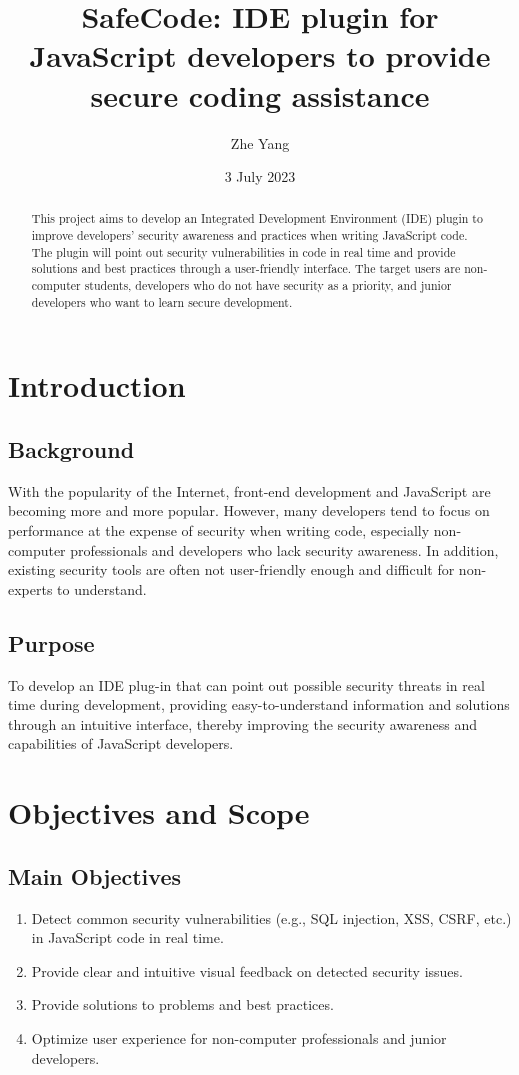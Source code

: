 \documentclass{proposal}
\title{SafeCode: IDE plugin for JavaScript developers to provide secure coding assistance}
\author{Zhe Yang}
\date{3 July 2023}
\begin{document}
\maketitle

\begin{abstract}
This project aims to develop an Integrated Development Environment (IDE) plugin to improve developers' security awareness and practices when writing JavaScript code. The plugin will point out security vulnerabilities in code in real time and provide solutions and best practices through a user-friendly interface. The target users are non-computer students, developers who do not have security as a priority, and junior developers who want to learn secure development.
\end{abstract}

\section{Introduction}

\subsection{Background}
With the popularity of the Internet, front-end development and JavaScript are becoming more and more popular. However, many developers tend to focus on performance at the expense of security when writing code, especially non-computer professionals and developers who lack security awareness. In addition, existing security tools are often not user-friendly enough and difficult for non-experts to understand.

\subsection{Purpose}
To develop an IDE plug-in that can point out possible security threats in real time during development, providing easy-to-understand information and solutions through an intuitive interface, thereby improving the security awareness and capabilities of JavaScript developers.

\section{Objectives and Scope}

\subsection{Main Objectives}
\begin{enumerate}
    \item Detect common security vulnerabilities (e.g., SQL injection, XSS, CSRF, etc.) in JavaScript code in real time.
    \item Provide clear and intuitive visual feedback on detected security issues.
    \item Provide solutions to problems and best practices.
    \item Optimize user experience for non-computer professionals and junior developers.
\end{enumerate}
\end{document}
